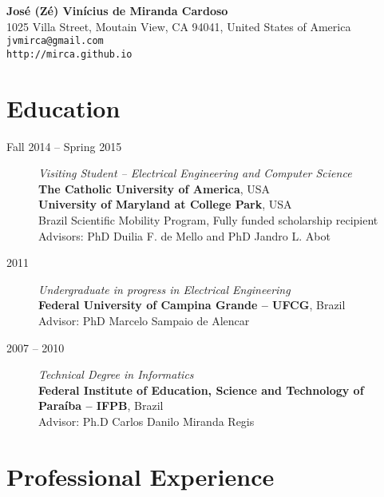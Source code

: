 \documentclass[10pt]{article}
\begin{document}
\pagestyle{empty}
\begin{titlepage}
 \begin{center}
     {\Large{\textbf{Jos\'e (Z\'e) Vin\'icius de Miranda Cardoso}}}\\
  1025 Villa Street, Moutain View, CA 94041, United States of America \\
  \texttt{jvmirca@gmail.com}\\ \texttt{http://mirca.github.io} \\
 \end{center}

\section{Education}

\begin{description}
 \item[Fall 2014 -- Spring 2015] \emph{Visiting Student -- Electrical Engineering and Computer Science} \\\textbf{The Catholic University of America}, USA\\
\textbf{University of Maryland at College Park}, USA \\ Brazil Scientific Mobility
 Program, Fully funded scholarship recipient \\ Advisors: PhD Duilia F. de Mello and PhD Jandro L. Abot
 \item[2011] \emph{Undergraduate in progress in Electrical Engineering} \\\textbf{Federal University of Campina Grande -- UFCG}, Brazil\\ Advisor: PhD Marcelo Sampaio de Alencar
 \item[2007 -- 2010] \emph{Technical Degree in Informatics} \\ \textbf{Federal Institute of Education, Science and Technology of Para\'iba -- IFPB}, Brazil \\ Advisor: Ph.D Carlos Danilo Miranda Regis
\end{description}

\section{Professional Experience}


\end{titlepage}
\end{document}
